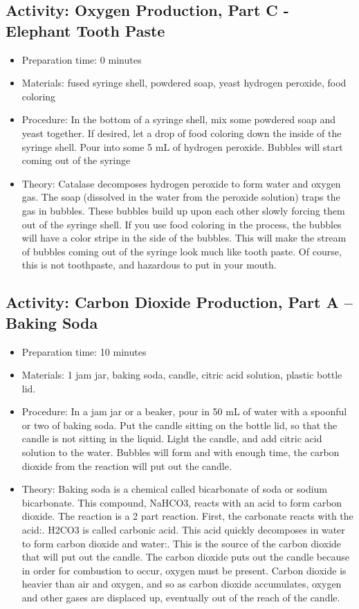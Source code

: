 \begin{itemize}
{\begin{itemize}
\begin{itemize}
{\subsection{Activity: Oxygen Production, Part C - Elephant Tooth Paste}
\begin{itemize}
\item{Preparation time: 0 minutes}
\item{Materials: fused syringe shell, powdered soap, yeast hydrogen peroxide, food coloring}
\item{Procedure: In the bottom of a syringe shell, mix some powdered soap and yeast together. If desired, let a drop of food coloring down the inside of the syringe shell. Pour into some 5 mL of hydrogen peroxide. Bubbles will start coming out of the syringe}
\item{Theory: Catalase decomposes hydrogen peroxide to form water and oxygen gas. The soap (dissolved in the water from the peroxide solution) traps the gas in bubbles. These bubbles build up upon each other slowly forcing them out of the syringe shell. If you use food coloring in the process, the bubbles will have a color stripe in the side of the bubbles. This will make the stream of bubbles coming out of the syringe look much like tooth paste. Of course, this is not toothpaste, and hazardous to put in your mouth.}
\end{itemize}

\subsection{Activity: Carbon Dioxide Production, Part A – Baking Soda}
\begin{itemize}
\item{Preparation time: 10 minutes}
\item{Materials: 1 jam jar, baking soda, candle, citric acid solution, plastic bottle lid.}
\item{Procedure: In a jam jar or a beaker, pour in 50 mL of water with a spoonful or two of baking soda. Put the candle sitting on the bottle lid, so that the candle is not sitting in the liquid. Light the candle, and add citric acid solution to the water. Bubbles will form and with enough time, the carbon dioxide from the reaction will put out the candle.}
\item{Theory: Baking soda is a chemical called bicarbonate of soda or sodium bicarbonate. This compound, NaHCO3, reacts with an acid to form carbon dioxide. The reaction is a 2 part reaction. First, the carbonate reacts with the acid:. H2CO3 is called carbonic acid. This acid quickly decomposes in water to form carbon dioxide and water:. This is the source of the carbon dioxide that will put out the candle. The carbon dioxide puts out the candle because in order for combustion to occur, oxygen must be present. Carbon dioxide is heavier than air and oxygen, and so as carbon dioxide accumulates, oxygen and other gases are displaced up, eventually out of the reach of the candle.}
\end{itemize}

}
\end{itemize}
\end{itemize}}
\end{itemize}
